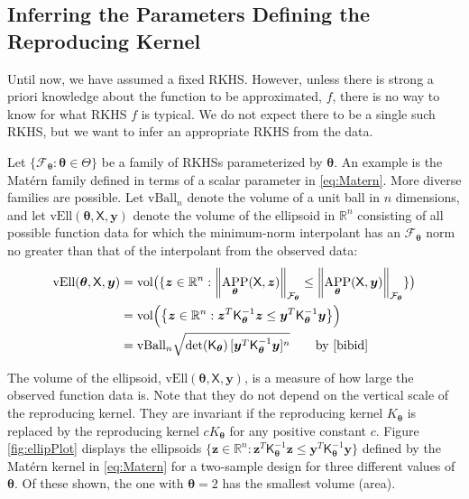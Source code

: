 \documentclass[]{mcom-l}
\theoremstyle{remark}
\newcommand{\vBall}{\text{vBall}_n}
\newcommand{\vEll}{\text{vEll}}
\DeclareMathOperator{\vol}{vol}
\DeclareMathOperator{\APP}{APP}
\newcommand{\reals}{{\mathbb{R}}}
\newcommand{\mK}{\mathsf{K}}
\newcommand{\mX}{\mathsf{X}}
\newcommand{\by}{{\boldsymbol{y}}}
\newcommand{\bz}{{\boldsymbol{z}}}
\newcommand{\btheta}{{\boldsymbol{\theta}}}
\newcommand{\calf}{{\mathcal{F}}}
\newcommand{\norm}[2][{}]{\ensuremath{\left \lVert #2 \right \rVert}_{#1}}
\begin{document}
\subsection{Inferring the Parameters Defining the Reproducing Kernel}

Until now, we have assumed a fixed RKHS.  However, unless there is strong a priori knowledge about the function to be approximated, $f$, there is no way to know for what RKHS $f$ is typical.  We do not expect there to be a single such RKHS, but we want to infer an appropriate RKHS from the data.  

Let $\{\calf_{\btheta} : \btheta \in \Theta\}$ be a family of RKHSs parameterized by $\btheta$.  An example is the Mat\'ern family defined in terms of a scalar parameter in \eqref{eq:Matern}.  More diverse families are possible.  Let $\vBall$ denote the volume of a unit ball in $n$ dimensions, and let $\vEll(\btheta,\mX,\by)$ denote the volume of the ellipsoid in $\reals^n$ consisting of all possible function data for which the minimum-norm interpolant has an $\calf_{\btheta}$ norm no greater than that of the interpolant from the observed data:
\begin{align*}
\vEll(\btheta,\mX,\by) &= \vol\bigl(\{ \bz \in \reals^n : \norm[\calf_{\btheta}]{\APP_{\btheta}(\mX,\bz)}  \le \norm[\calf_{\btheta}]{\APP_{\btheta}(\mX,\by)} \} \bigr) \\
& = \vol\Bigl( \bigl \{ \bz \in \reals^n : \bz^T \mK_\btheta^{-1} \bz \le \by^T \mK_\btheta^{-1} \by  \bigr \} \Bigr) \\
& = \vBall \sqrt{\det(\mK_{\btheta})  \, [\by^T \mK_\btheta^{-1} \by]^n } \qquad \text{by \cite{bibid}}
\end{align*}

The volume of the ellipsoid, $\vEll(\btheta,\mX,\by)$, is a measure of how large the observed function data is.  Note that they do not depend on the vertical scale of the reproducing kernel.  They are invariant if the reproducing kernel $K_\btheta$ is replaced by the reproducing kernel $cK_{\btheta}$ for any positive constant $c$.  Figure \ref{fig:ellipPlot} displays the ellipsoids $\{ \bz \in \reals^n : \bz^T \mK_\btheta^{-1} \bz \le \by^T \mK_\btheta^{-1} \by  \bigr \}$  defined by the Mat\'ern kernel in \eqref{eq:Matern} for a two-sample design for three different values of $\btheta$.  Of these shown, the one with $\btheta = 2$ has the smallest volume (area).
\end{document}
